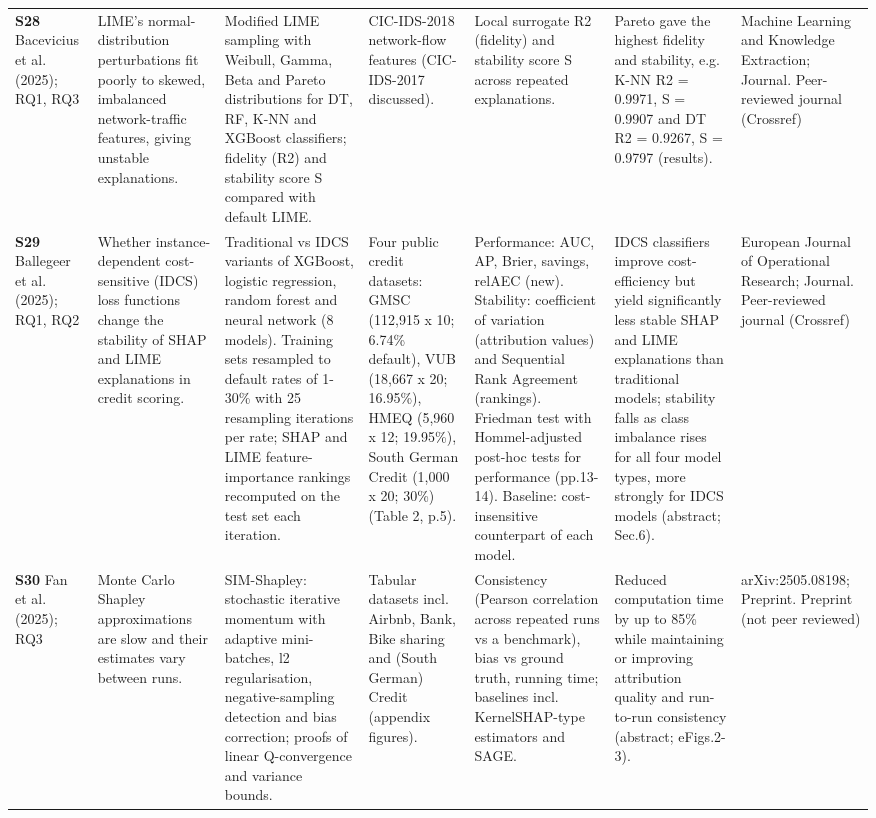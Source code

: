 \begin{longtable}{@{}P{1.55cm}P{2.9cm}P{4.5cm}P{3.2cm}P{3.4cm}P{4.6cm}P{3.6cm}@{}}
\textbf{S28} \cite{S28} Bacevicius et al. (2025); RQ1, RQ3 & LIME's normal-distribution perturbations fit poorly to skewed, imbalanced network-traffic features, giving unstable explanations. & Modified LIME sampling with Weibull, Gamma, Beta and Pareto distributions for DT, RF, K-NN and XGBoost classifiers; fidelity (R2) and stability score S compared with default LIME. & CIC-IDS-2018 network-flow features (CIC-IDS-2017 discussed). & Local surrogate R2 (fidelity) and stability score S across repeated explanations. & Pareto gave the highest fidelity and stability, e.g. K-NN R2 = 0.9971, S = 0.9907 and DT R2 = 0.9267, S = 0.9797 (results). & Machine Learning and Knowledge Extraction; Journal. Peer-reviewed journal (Crossref) \\
\textbf{S29} \cite{S29} Ballegeer et al. (2025); RQ1, RQ2 & Whether instance-dependent cost-sensitive (IDCS) loss functions change the stability of SHAP and LIME explanations in credit scoring. & Traditional vs IDCS variants of XGBoost, logistic regression, random forest and neural network (8 models). Training sets resampled to default rates of 1-30\% with 25 resampling iterations per rate; SHAP and LIME feature-importance rankings recomputed on the test set each iteration. & Four public credit datasets: GMSC (112,915 x 10; 6.74\% default), VUB (18,667 x 20; 16.95\%), HMEQ (5,960 x 12; 19.95\%), South German Credit (1,000 x 20; 30\%) (Table 2, p.5). & Performance: AUC, AP, Brier, savings, relAEC (new). Stability: coefficient of variation (attribution values) and Sequential Rank Agreement (rankings). Friedman test with Hommel-adjusted post-hoc tests for performance (pp.13-14). Baseline: cost-insensitive counterpart of each model. & IDCS classifiers improve cost-efficiency but yield significantly less stable SHAP and LIME explanations than traditional models; stability falls as class imbalance rises for all four model types, more strongly for IDCS models (abstract; Sec.6). & European Journal of Operational Research; Journal. Peer-reviewed journal (Crossref) \\
\textbf{S30} \cite{S30} Fan et al. (2025); RQ3 & Monte Carlo Shapley approximations are slow and their estimates vary between runs. & SIM-Shapley: stochastic iterative momentum with adaptive mini-batches, l2 regularisation, negative-sampling detection and bias correction; proofs of linear Q-convergence and variance bounds. & Tabular datasets incl. Airbnb, Bank, Bike sharing and (South German) Credit (appendix figures). & Consistency (Pearson correlation across repeated runs vs a benchmark), bias vs ground truth, running time; baselines incl. KernelSHAP-type estimators and SAGE. & Reduced computation time by up to 85\% while maintaining or improving attribution quality and run-to-run consistency (abstract; eFigs.2-3). & arXiv:2505.08198; Preprint. Preprint (not peer reviewed) \\

\end{longtable}
